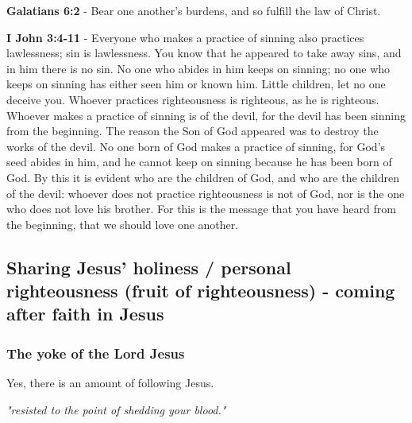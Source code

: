 \documentclass[11pt]{article}
\begin{document}
\textbf{Galatians 6:2} - Bear one another's burdens, and so fulfill the law of Christ.

\textbf{I John 3:4-11} - Everyone who makes a practice of sinning also practices lawlessness; sin is lawlessness.  You know that he appeared to take away sins, and in him there is no sin.  No one who abides in him keeps on sinning; no one who keeps on sinning has either seen him or known him.  Little children, let no one deceive you. Whoever practices righteousness is righteous, as he is righteous.  Whoever makes a practice of sinning is of the devil, for the devil has been sinning from the beginning. The reason the Son of God appeared was to destroy the works of the devil.  No one born of God makes a practice of sinning, for God's seed abides in him, and he cannot keep on sinning because he has been born of God.  By this it is evident who are the children of God, and who are the children of the devil: whoever does not practice righteousness is not of God, nor is the one who does not love his brother.  For this is the message that you have heard from the beginning, that we should love one another.

\subsection{Sharing Jesus' holiness / personal righteousness (fruit of righteousness) - coming \textbf{after} faith in Jesus}
\label{sec:org4a78c48}
\subsubsection{The yoke of the Lord Jesus}
\label{sec:org1d45d4f}
Yes, there is an amount of following Jesus.

\emph{"resisted to the point of shedding your blood."}
\end{document}
